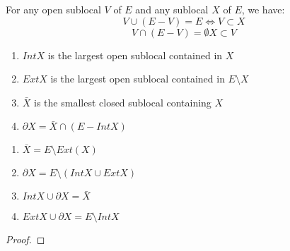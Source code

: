 \begin{lemma}
    \label{lem:properties_of_complements_part_2}
    \leanok
    For any open sublocal $V$ of $E$ and any sublocal $X$ of $E$, we have:
    \[V \cup (E - V) = E \iff V \subset X \]
    \[V \cap (E - V) = \emptyset X \subset V\]
\end{lemma}



\begin{comment}
\begin{lemma}[(1.11) Distribution of Intersections over Unions]
    \label{lem:distribution_of_intersections_over_unions}
    \uses{lem:open_closed_intersection}
    Let $X, Y, L$ be three sub locals of $E$. If $L$ is open or closed, we have:
    \[L \cap (X \cap Y) = (L \cap X) \cup (L \cap Y)\]
\end{lemma}
\end{comment}
\begin{definition}
    \label{def:further_topology}
    \leanok
    \begin{enumerate}
        \item $Int X$ is the largest open sublocal contained in $X$
        \item $Ext X$ is the largest open sublocal contained in $E \setminus X$
        \item $\bar{X}$ is the smallest closed sublocal containing $X$
        \item $\partial X = \bar{X} \cap (E - Int X)$
    \end{enumerate}
\end{definition}

\begin{lemma} 
    \label{lem:properties_of_further_topology}
    \leanok
    \begin{enumerate}
        \item $\bar{X} = E \setminus Ext(X)$
        \item $\partial X = E \setminus (Int X \cup Ext X)$
        \item $Int X \cup \partial X = \bar X$
        \item $Ext X \cup \partial X = E \setminus Int X$
    \end{enumerate}
\end{lemma}

\begin{proof}
\end{proof}


